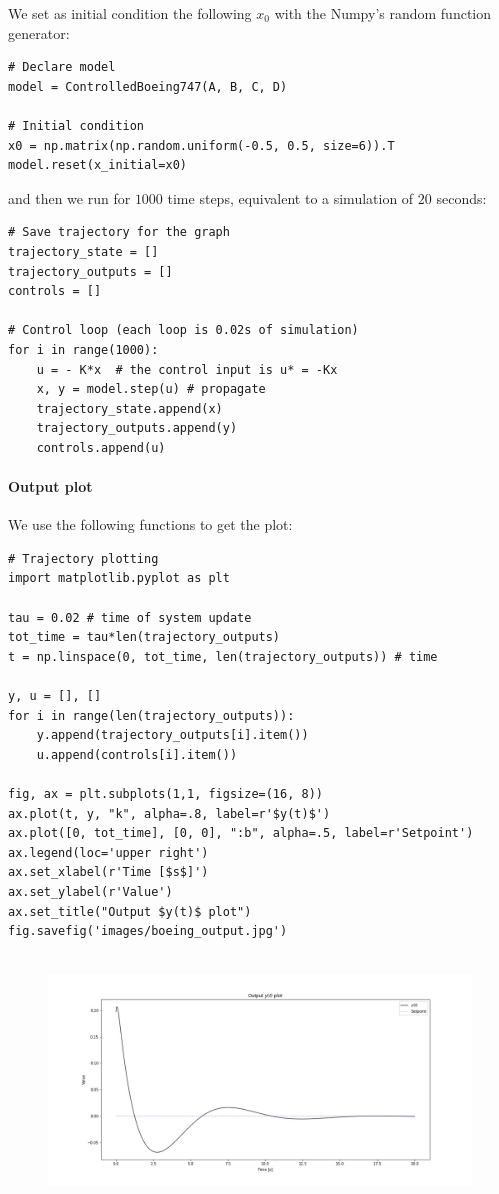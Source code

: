  We set as initial condition the following $x_0$ with the Numpy's random function generator: 
 \begin{verbatim}
# Declare model
model = ControlledBoeing747(A, B, C, D)

# Initial condition
x0 = np.matrix(np.random.uniform(-0.5, 0.5, size=6)).T    
model.reset(x_initial=x0)
 \end{verbatim}
and then we run for $1000$ time steps, equivalent to a simulation of $20$ seconds:
\begin{verbatim}
# Save trajectory for the graph
trajectory_state = []
trajectory_outputs = []
controls = []

# Control loop (each loop is 0.02s of simulation)
for i in range(1000):
    u = - K*x  # the control input is u* = -Kx
    x, y = model.step(u) # propagate
    trajectory_state.append(x)
    trajectory_outputs.append(y)
    controls.append(u)
\end{verbatim}
 
\paragraph{Output plot} We use the following functions to get the plot:

\begin{verbatim}
# Trajectory plotting
import matplotlib.pyplot as plt

tau = 0.02 # time of system update
tot_time = tau*len(trajectory_outputs)
t = np.linspace(0, tot_time, len(trajectory_outputs)) # time

y, u = [], []
for i in range(len(trajectory_outputs)):
    y.append(trajectory_outputs[i].item())
    u.append(controls[i].item())

fig, ax = plt.subplots(1,1, figsize=(16, 8))
ax.plot(t, y, "k", alpha=.8, label=r'$y(t)$')
ax.plot([0, tot_time], [0, 0], ":b", alpha=.5, label=r'Setpoint')
ax.legend(loc='upper right')
ax.set_xlabel(r'Time [$s$]')
ax.set_ylabel(r'Value')
ax.set_title("Output $y(t)$ plot")
fig.savefig('images/boeing_output.jpg')
  
\end{verbatim}

\begin{figure}[h!]
    \centering
    \includegraphics[width=\linewidth]{images/boeing_output.jpg}
\end{figure}

